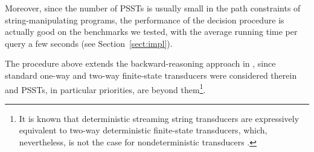 Moreover, since the number of PSSTs is usually small in the path constraints of string-manipulating programs, the performance of the decision procedure is actually good on the benchmarks we tested, with the average running time per query a few seconds (see Section~\ref{sect:impl}).



\begin{remark}
The procedure above extends the backward-reasoning approach in \cite{CHL+19}, since standard one-way and two-way finite-state transducers were considered therein and PSSTs, in particular priorities, are beyond them\footnote{It is known that deterministic streaming string transducers are expressively equivalent to two-way deterministic finite-state transducers, which, nevertheless, is not the case for nondeterministic transducers \cite{AC10,AD11}.}.
\end{remark}





